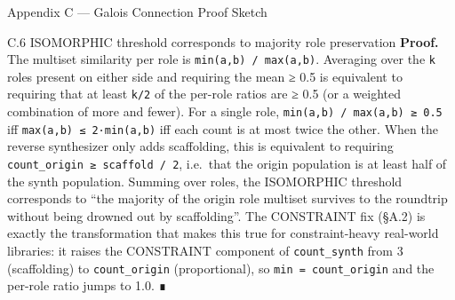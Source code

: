 \documentclass[
  ignorenonframetext,
]{beamer}
\begin{document}
\begin{frame}[fragile]{Appendix C --- Galois Connection Proof Sketch}
\begin{block}{C.6 ISOMORPHIC threshold corresponds to majority role
preservation}
\textbf{Proof.} The multiset similarity per role is
\texttt{min(a,b)\ /\ max(a,b)}. Averaging over the \texttt{k} roles
present on either side and requiring the mean ≥ 0.5 is equivalent to
requiring that at least \texttt{k/2} of the per-role ratios are ≥ 0.5
(or a weighted combination of more and fewer). For a single role,
\texttt{min(a,b)\ /\ max(a,b)\ ≥\ 0.5} iff
\texttt{max(a,b)\ ≤\ 2·min(a,b)} iff each count is at most twice the
other. When the reverse synthesizer only adds scaffolding, this is
equivalent to requiring \texttt{count\_origin\ ≥\ scaffold\ /\ 2},
i.e.~that the origin population is at least half of the synth
population. Summing over roles, the ISOMORPHIC threshold corresponds to
``the majority of the origin role multiset survives to the roundtrip
without being drowned out by scaffolding''. The CONSTRAINT fix (§A.2) is
exactly the transformation that makes this true for constraint-heavy
real-world libraries: it raises the CONSTRAINT component of
\texttt{count\_synth} from 3 (scaffolding) to \texttt{count\_origin}
(proportional), so \texttt{min\ =\ count\_origin} and the per-role ratio
jumps to 1.0. ∎
\end{block}
\end{frame}

\begin{frame}
\end{frame}
\end{document}
